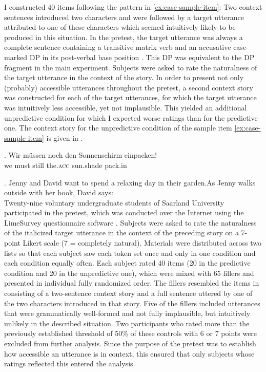 I constructed 40 items following the pattern in \ref{ex:case-sample-item}: Two context sentences introduced two characters and were followed by a target utterance attributed to one of these characters which seemed intuitively likely to be produced in this situation. In the pretest, the target utterance was always a complete sentence containing a transitive matrix verb and an accusative case-marked DP in its post-verbal base position \Next. This DP was equivalent to the DP fragment in the main experiment. Subjects were asked to rate the naturalness of the target utterance in the context of the story. In order to present not only (probably) accessible utterances throughout the pretest, a second context story was constructed for each of the target utterances, for which the target utterance was intuitively less accessible, yet not implausible. This yielded an additional unpredictive condition for which I expected worse ratings than for the predictive one. The context story for the unpredictive condition of the sample item \ref{ex:case-sample-item} is given in \NNext. 

\exg. Wir müssen noch den Sonnenschirm einpacken!\\ 
we must still the.\textsc{acc} sun.shade pack.in\\

\ex. Jenny and David want to spend a relaxing day in their garden.\linebreak As Jenny walks outside with her book, David says:\\

Twenty-nine voluntary undergraduate students of Saarland University participated in the pretest, which was conducted over the Internet using the LimeSurvey questionnaire software \citep{limesurveygmbh2012}. Subjects were asked to rate the naturalness of the italicized target utterance in the context of the preceding story on a 7-point Likert scale (7 = completely natural). Materials were distributed across two lists so that each subject saw each token set once and only in one condition and each condition equally often. Each subject rated 40 items (20 in the predictive condition and 20 in the unpredictive one), which were mixed with 65 fillers and presented in individual fully randomized order. The fillers resembled the items in consisting of a two-sentence context story and a full sentence uttered by one of the two characters introduced in that story. Five of the fillers included utterances that were grammatically well-formed and not fully implausible, but intuitively unlikely in the described situation. Two participants who rated more than the previously established threshold of 50\% of these controls with 6 or 7 points were excluded from further analysis. Since the purpose of the pretest was to establish how accessible an utterance is in context, this ensured that only subjects whose ratings reflected this entered the analysis.


